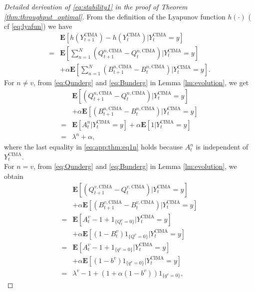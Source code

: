 \documentclass[onecolumn,draftcls]{IEEEtran}
\newcommand{\g}{\text{CIMA}}
\begin{document}
\section{}
\label{app:thm}
\begin{proof}[Detailed derivation of \eqref{eq:stability1} in the proof of Theorem \ref{thm:throughput_optimal}]
From the definition of the Lyapunov function $h(\cdot)$ ( cf \eqref{eq:lyafun}) we have
\begin{align}
 & \mathbf{E}\left[h(Y^{\g}_{t+1}) - h(Y^{\g}_t) | Y^{\g}_t=y\right] \nonumber\\
= &\mathbf{E}\left[ 
\sum_{n=1}^N (Q^{n,\g}_{t+1}-Q^{n,\g}_t) | Y^{\g}_t=y\right]\nonumber\\
& + \alpha \mathbf{E}\left[ 
\sum_{n=1}^N (B^{n,\g}_{t+1}- B^{n,\g}_t) | Y^{\g}_t=y\right].
\label{eq:app:thm:eq1}
\end{align}
For $n\neq v$, from \eqref{eq:Qunderg} and \eqref{eq:Bunderg} in Lemma \ref{lm:evolution}, we get
\begin{align}
 &\mathbf{E}\left[ (Q^{n,\g}_{t+1}-Q^{n,\g}_t) | Y^{\g}_t=y\right]\nonumber\\
& + \alpha \mathbf{E}\left[ 
(B^{n,\g}_{t+1}- B^{n,\g}_t) | Y^{\g}_t=y\right]\nonumber\\
= &\mathbf{E}\left[ A^n_t| Y^{\g}_t=y\right] + \alpha \mathbf{E}\left[ 1 | Y^{\g}_t=y\right]\nonumber\\
= & \lambda^n + \alpha,
\label{eq:app:thm:eq1n}
\end{align}
where the last equality in \eqref{eq:app:thm:eq1n} holds because $A^n_t$ is independent of $Y^{\g}_t$.
\\
For $n= v$, from \eqref{eq:Qunderg} and \eqref{eq:Bunderg} in Lemma \ref{lm:evolution}, we obtain
\begin{align}
 &\mathbf{E}\left[ (Q^{v,\g}_{t+1}-Q^{v,\g}_t) | Y^{\g}_t=y\right]\nonumber\\
& + \alpha \mathbf{E}\left[ 
(B^{v,\g}_{t+1}- B^{v,\g}_t) | Y^{\g}_t=y\right]\nonumber\\
= &\mathbf{E}\left[ A^v_t-1 + 1_{\{Q^v_t=0\}}| Y^{\g}_t=y\right] \nonumber\\
&+ \alpha \mathbf{E}\left[ (1-B^v_t)1_{\{Q^v=0\}} | Y^{\g}_t=y\right]\nonumber\\
= &\mathbf{E}\left[ A^v_t-1 + 1_{\{q^v=0\}}| Y^{\g}_t=y\right] \nonumber\\
&+ \alpha \mathbf{E}\left[ (1-b^v)1_{\{q^v=0\}} | Y^{\g}_t=y\right]\nonumber\\
= & \lambda^v - 1 + (1 + \alpha(1-b^v))   1_{\{q^v=0\}},

\end{align}
\end{proof}
\end{document}
